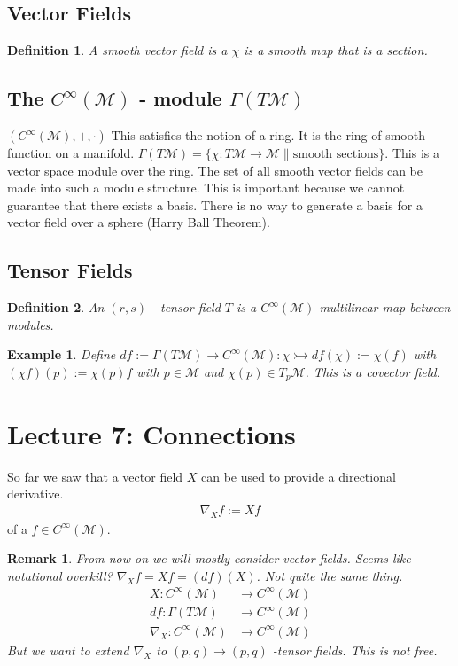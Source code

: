 \documentclass[10pt, oneside]{article}
\newcommand{\M}{\mathcal{M}}
\newtheorem{defn}{Definition}
\newtheorem{example}{Example}
\newtheorem{remark}{Remark}
\begin{document}
  \subsection{Vector Fields}
  \begin{defn}
     A smooth vector field is a $\chi$ is a smooth map that is a section.
  \end{defn}
  \subsection{The $C^\infty (\M)$ - module $\Gamma (T \M)$}
  $(C^{\infty} (\M), +, \cdot)$ This satisfies the notion of a ring. It is the ring of smooth function on a manifold. $\Gamma (T \M) = \{ \chi : T \M \to \M \| \text{smooth sections} \}$. This is a vector space module over the ring. The set of all smooth vector fields can be made into such a module structure. This is important because we cannot guarantee that there exists a basis. There is no way to generate a basis for a vector field over a sphere (Harry Ball Theorem).
  \subsection{Tensor Fields}
  \begin{defn}
     An $(r,s)$ - tensor field $T$ is a $C^{\infty} (\M)$ multilinear map between modules.
  \end{defn}
  \begin{example}
     Define $df := \Gamma(T \M) \to C^\infty (\M): \chi \rightarrowtail df(\chi) := \chi (f)$ with $(\chi f)(p) := \chi (p) f $ with $p \in \M$ and $\chi(p) \in T_p \M$. This is a covector field.
  \end{example}
\section{Lecture 7: Connections}
 So far we saw that a vector field $X$ can be used to provide a directional derivative.
 \begin{align*}
     \nabla_X f := Xf
 \end{align*}
 of a $f \in C^\infty (\M)$.
 \begin{remark}
  From now on we will mostly consider vector fields. Seems like notational overkill? $\nabla_X f = Xf = (df)(X)$. Not quite the same thing.
  \begin{align*}
     X: C^{\infty} (\M) &\to C^{\infty} (\M) \\
     df: \Gamma(T \M) &\to C^\infty (\M) \\
     \nabla_X: C^\infty (\M) &\to C^\infty (\M)
  \end{align*}
  But we want to extend $\nabla_X$ to $(p,q) \to (p,q)$ -tensor fields. This is not free.
 \end{remark}
\end{document}
